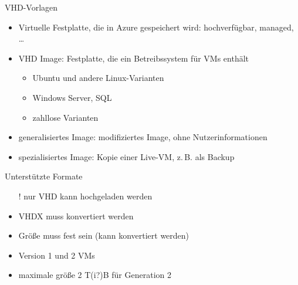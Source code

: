 

\begin{flashcard}[Definition]{VHD-Vorlagen}
    \begin{itemize}
        \item Virtuelle Festplatte, die in Azure gespeichert wird: hochverfügbar, managed, \ldots
        \item VHD Image: Festplatte, die ein Betreibssystem für VMs enthält
            \begin{itemize}
                \item Ubuntu und andere Linux-Varianten
                \item Windows Server, SQL
                \item zahllose Varianten
            \end{itemize}
        \item generalisiertes Image:\newline
            modifiziertes Image, ohne Nutzerinformationen
        \item spezialisiertes Image:\newline
            Kopie einer Live-VM, z.\,B. als Backup
    \end{itemize}
\end{flashcard}

\begin{flashcard}[Definition]{Unterstützte Formate}
    \begin{itemize}
        \item[!] nur VHD kann hochgeladen werden
        \item VHDX muss konvertiert werden
        \item Größe muss fest sein (kann konvertiert werden)
        \item Version 1 und 2 VMs
        \item maximale größe 2 T(i?)B für Generation 2
    \end{itemize}
\end{flashcard}


